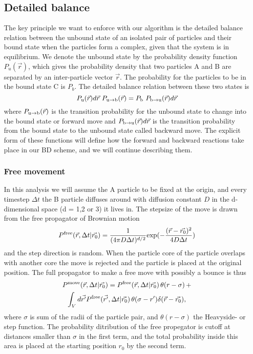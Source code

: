 \subsection{Detailed balance}

The key principle we want to enforce with our algorithm is the detailed balance relation between the unbound state of an isolated pair of particles and their bound state when the particles form a complex, given that the system is in equilibrium. We denote the unbound state by the probability density function $P_u(\vec{r})$, which gives the probability density that two particles A and B are separated by an inter-particle vector $\vec{r}$. The probability for the particles to be in the bound state C is $P_b$. The detailed balance relation between these two states is
\begin{equation}
 P_{ \rm{u} }(\vec{r})d\vec{r} \,\, P_{ \rm{u} \to \rm{b} }(\vec{r}) = P_{ \rm{b} } \,\, P_{ \rm{b} \to \rm{u} }(\vec{r})d\vec{r}
\elabel{DBeqn}
\end{equation}
where $P_{ \rm{u} \to \rm{b} }(\vec{r})$ is the transition probability for the unbound state to change into the bound state or forward move and $P_{ \rm{b} \to \rm{u}}(\vec{r})d\vec{r}$ is the transition probability from the bound state to the unbound state called backward move. The explicit form of these functions will define how the forward and backward reactions take place in our BD scheme, and we will continue describing them. 

\subsubsection{Free movement}
In this analysis we will assume the A particle to be fixed at the origin, and every timestep $\Delta t$ the B particle diffuses around with diffusion constant $D$ in the d-dimensional space (d = 1,2 or 3) it lives in. The stepsize of the move is drawn from the free propagator of Brownian motion 
\begin{equation}
P^{\rm free}(\vec{r},\Delta t|\vec{r_0}) = \frac{1}{(4 \pi D \Delta t)^{d/2}}{\rm exp}(-\frac{(\vec{r}-\vec{r_0})^2}{4 D \Delta t}) 
\end{equation}
and the step direction is random. When the particle core of the particle overlaps with another core the move is rejected and the particle is placed at the original position. The full propagator to make a free move with possibly a bounce is thus
\begin{multline}
 P^{\rm move}(\vec{r},\Delta t|\vec{r_0}) = P^{\rm free}(\vec{r},\Delta t|\vec{r_0}) \, \theta(r - \sigma) \, + \\ \int_{V} d\vec{r'}P^{\rm free}(\vec{r'},\Delta t|\vec{r_0}) \, \theta(\sigma - r')\delta(\vec{r}-\vec{r_0}),
\elabel{move_prop}
\end{multline}
where $\sigma$ is sum of the radii of the particle pair, and $\theta(r - \sigma)$ the Heavyside- or step function. The probability ditribution of the free propegator is cutoff at distances smaller than $\sigma$ in the first term, and the total probability inside this area is placed at the starting position $r_0$ by the second term.

